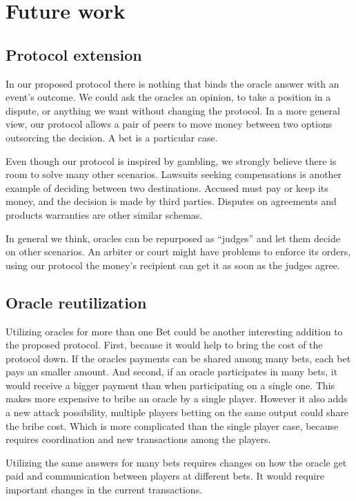 \section{Future work}
\subsection{Protocol extension}

In our proposed protocol there is nothing that binds the oracle answer with an
  event's outcome.
We could ask the oracles an opinion, to take a position in a dispute, or
  anything we want without changing the protocol.
In a more general view, our protocol allows a pair of peers to move money
  between two options outsorcing the decision.
A bet is a particular case.

Even though our protocol is inspired by gambling, we strongly believe there is
  room to solve many other scenarios.
Lawsuits  seeking compensations is another example of deciding between two
  destinations.
Accused must pay or keep its money, and the decision is made by third parties.
Disputes on agreements and products warranties are other similar schemas.

In general we think, oracles can be repurposed as ``judges'' and let them
  decide on other scenarios.
An arbiter or court might have problems to enforce its orders, using our
  protocol the money's recipient can get it as soon as the judges agree.

\subsection{Oracle reutilization}
Utilizing oracles for more than one Bet could be another interesting addition to
  the proposed protocol.
First, because it would help to bring the cost of the protocol down.
If the oracles payments can be shared among many bets, each bet pays
  an smaller amount.
And second, if an oracle participates in many bets, it would receive a bigger
  payment than when participating on a single one.
This makes more expensive to bribe an oracle by a single player.
However it also adds a new attack possibility, multiple players betting on the
  same output could share the bribe cost.
Which is more complicated than the single player case, because requires
  coordination and new transactions among the players.

Utilizing the same answers for many bets requires changes on how the oracle get
  paid and communication between players at different bets.
It would require important changes in the current transactions.
